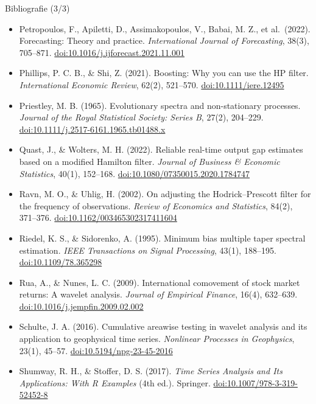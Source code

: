\begin{frame}{Bibliografie (3/3)}
\itemsize{\tiny}
\begin{itemize}
    \item Petropoulos, F., Apiletti, D., Assimakopoulos, V., Babai, M. Z., et al.\ (2022). Forecasting: Theory and practice. \textit{International Journal of Forecasting}, 38(3), 705--871. \href{https://doi.org/10.1016/j.ijforecast.2021.11.001}{doi:10.1016/j.ijforecast.2021.11.001}
    \item Phillips, P. C. B., \& Shi, Z. (2021). Boosting: Why you can use the HP filter. \textit{International Economic Review}, 62(2), 521--570. \href{https://doi.org/10.1111/iere.12495}{doi:10.1111/iere.12495}
    \item Priestley, M. B. (1965). Evolutionary spectra and non-stationary processes. \textit{Journal of the Royal Statistical Society: Series B}, 27(2), 204--229. \href{https://doi.org/10.1111/j.2517-6161.1965.tb01488.x}{doi:10.1111/j.2517-6161.1965.tb01488.x}
    \item Quast, J., \& Wolters, M. H. (2022). Reliable real-time output gap estimates based on a modified Hamilton filter. \textit{Journal of Business \& Economic Statistics}, 40(1), 152--168. \href{https://doi.org/10.1080/07350015.2020.1784747}{doi:10.1080/07350015.2020.1784747}
    \item Ravn, M. O., \& Uhlig, H. (2002). On adjusting the Hodrick--Prescott filter for the frequency of observations. \textit{Review of Economics and Statistics}, 84(2), 371--376. \href{https://doi.org/10.1162/003465302317411604}{doi:10.1162/003465302317411604}
    \item Riedel, K. S., \& Sidorenko, A. (1995). Minimum bias multiple taper spectral estimation. \textit{IEEE Transactions on Signal Processing}, 43(1), 188--195. \href{https://doi.org/10.1109/78.365298}{doi:10.1109/78.365298}
    \item Rua, A., \& Nunes, L. C. (2009). International comovement of stock market returns: A wavelet analysis. \textit{Journal of Empirical Finance}, 16(4), 632--639. \href{https://doi.org/10.1016/j.jempfin.2009.02.002}{doi:10.1016/j.jempfin.2009.02.002}
    \item Schulte, J. A. (2016). Cumulative areawise testing in wavelet analysis and its application to geophysical time series. \textit{Nonlinear Processes in Geophysics}, 23(1), 45--57. \href{https://doi.org/10.5194/npg-23-45-2016}{doi:10.5194/npg-23-45-2016}
    \item Shumway, R. H., \& Stoffer, D. S. (2017). \textit{Time Series Analysis and Its Applications: With R Examples} (4th ed.). Springer. \href{https://doi.org/10.1007/978-3-319-52452-8}{doi:10.1007/978-3-319-52452-8}

\end{itemize}
\end{frame}
